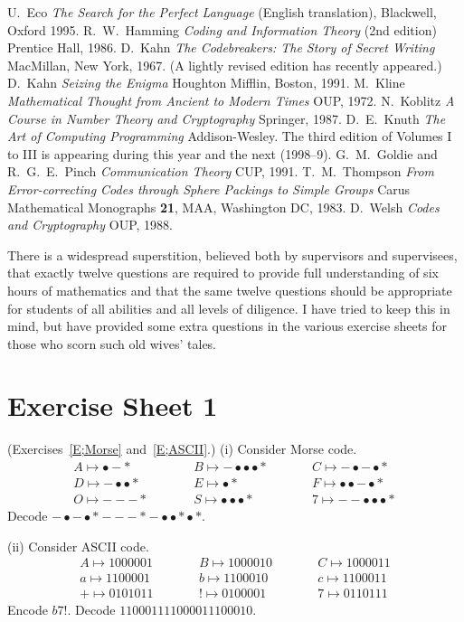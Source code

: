 \begin{thebibliography}{99}
 U.~Eco \emph{The Search for the Perfect Language}
(English translation), Blackwell, Oxford 1995.
 R.~W.~Hamming \emph{Coding and Information Theory}
(2nd edition) Prentice Hall, 1986.
 D.~Kahn \emph{The Codebreakers:
The Story of Secret Writing} MacMillan, New York, 1967.
(A lightly revised edition has recently appeared.)
 D.~Kahn
\emph{Seizing the Enigma} Houghton Mifflin, Boston, 1991.
 M.~Kline
\emph{Mathematical Thought from Ancient to
Modern Times} OUP, 1972.
 N.~Koblitz
\emph{A Course in Number Theory and Cryptography}
Springer, 1987.
 D.~E.~Knuth
\emph{The Art of Computing Programming}
Addison-Wesley. The third edition of
Volumes I to III is appearing during
this year and the next (1998--9).
 G.~M.~Goldie and R.~G.~E.~Pinch
\emph{Communication Theory}
CUP, 1991.
 T.~M.~Thompson
\emph{From Error-correcting Codes through Sphere Packings
to Simple Groups} Carus Mathematical Monographs {\bf 21},
MAA, Washington DC, 1983.
 D.~Welsh \emph{Codes and Cryptography}
OUP, 1988.
\end{thebibliography}


\newpage
There is a widespread superstition, believed both by supervisors
and supervisees, that exactly twelve questions are required
to provide full understanding of six hours of  mathematics
and that the same twelve questions should be appropriate
for students of all abilities and all levels of diligence. I have tried
to keep this in mind, but have provided some extra questions
in the various exercise sheets
for those who scorn such old wives' tales.
 
\section{Exercise Sheet 1}
\begin{question}\label{C1.1} 
(Exercises~\ref{E;Morse} and~\ref{E;ASCII}.) (i) 
Consider Morse code.
\begin{align*}
A\mapsto \bullet-*\qquad
&&B\mapsto -\bullet\bullet\bullet*\qquad
&&C\mapsto-\bullet-\bullet*\\
D\mapsto -\bullet\bullet*\qquad
&&E\mapsto \bullet*\qquad
&&F\mapsto\bullet\bullet-\bullet*\\
O\mapsto ---*\qquad
&&S\mapsto\bullet\bullet\bullet*\qquad
&&7\mapsto--\bullet\bullet\bullet*
\end{align*}
Decode
$-\bullet-\bullet*---*-\bullet\bullet* \bullet*$.


(ii) Consider ASCII code.
\begin{align*}
A\mapsto 1000001\qquad
&&B\mapsto 1000010\qquad
&&C\mapsto 1000011\\
a\mapsto 1100001\qquad
&&b\mapsto 1100010 \qquad
&&c\mapsto 1100011\\
+\mapsto 0101011\qquad
&&!\mapsto 0100001\qquad
&&7\mapsto 0110111
\end{align*}
Encode $b7!$. Decode $110001111000011100010$.
\end{question}

